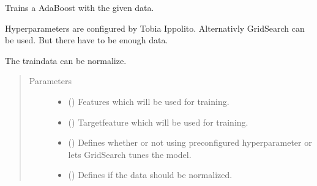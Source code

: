 \documentclass[letterpaper,10pt,english]{sphinxmanual}
\begin{document}

\begin{fulllineitems}
\label{\detokenize{anoog.model:anoog.model.model.train_adaboost}}
\sphinxAtStartPar
Trains a AdaBoost with the given data.

\sphinxAtStartPar
Hyperparameters are configured by Tobia Ippolito. Alternativly GridSearch can be used. But there have to be enough data.

\sphinxAtStartPar
The traindata can be normalize.
\begin{quote}\begin{description}
\item[{Parameters}] \leavevmode\begin{itemize}
\item {} 
\sphinxAtStartPar
{} () \textendash{} Features which will be used for training.

\item {} 
\sphinxAtStartPar
{} () \textendash{} Target\sphinxhyphen{}feature which will be used for training.

\item {} 
\sphinxAtStartPar
{} (\sphinxstyleliteralemphasis{\sphinxupquote{, }}) \textendash{} Defines whether or not using preconfigured hyperparameter or lets GridSearch tunes the model.

\item {} 
\sphinxAtStartPar
{} (\sphinxstyleliteralemphasis{\sphinxupquote{, }}) \textendash{} Defines if the data should be normalized.


\end{itemize}
\end{description}
\end{quote}
\end{fulllineitems}
\end{document}
